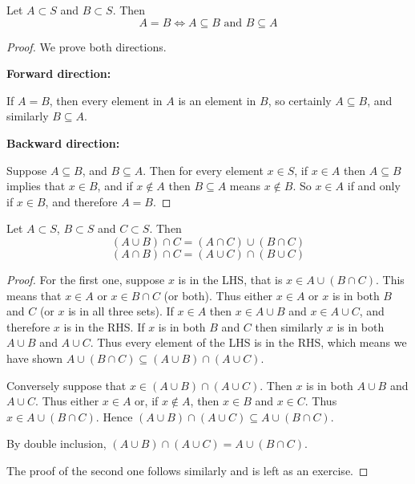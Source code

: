 \begin{proposition}
Let $A\subset S$ and $B\subset S$. Then 
\begin{equation}
A = B \iff A \subseteq B \text{ and } B \subseteq A
\end{equation}
\end{proposition}
\begin{proof} We prove both directions.

\textbf{Forward direction:}

If $A = B$, then every element in $A$ is an element in $B$, so certainly $A \subseteq B$, and
similarly $B \subseteq A$. 

\textbf{Backward direction:}

Suppose $A \subseteq B$, and $B \subseteq A$. Then for every element $x \in S$, if $x \in A$ then $A \subseteq B$ implies that $x \in B$, and if $x \notin A$ then $B \subseteq A$ means $x \notin B$. So $x \in A$ if and only if $x \in B$, and therefore $A = B$.
\end{proof}

\begin{proposition}
Let $A\subset S$, $B\subset S$ and $C\subset S$. Then
\begin{equation}
(A\cup B)\cap C = (A\cap C)\cup(B\cap C)
\end{equation}
\begin{equation}
(A\cap B)\cap C = (A\cup C)\cap(B\cup C)
\end{equation}
\end{proposition}
\begin{proof}
For the first one, suppose $x$ is in the LHS, that is $x \in A\cup(B \cap C)$. This means that $x \in A$ or $x \in B \cap C$ (or both). Thus either $x \in A$ or $x$ is in both $B$ and $C$ (or $x$ is in all three sets). If $x \in A$ then $x \in A\cup B$ and $x \in A\cup C$, and therefore $x$ is in the RHS. If $x$ is in both $B$ and $C$ then similarly $x$ is in both $A\cup B$ and $A\cup C$. Thus every element of the LHS is in the RHS, which means we have shown $A \cup (B \cap C) \subseteq (A \cup B) \cap (A \cup C)$.

Conversely suppose that $x \in (A \cup B) \cap (A \cup C)$. Then $x$ is in both $A \cup B$ and $A\cup C$. Thus either $x \in A$ or, if $x \notin A$, then $x \in B$ and $x \in C$. Thus $x \in A\cup(B \cap C)$. Hence $(A \cup B) \cap (A \cup C) \subseteq A \cup (B \cap C)$.

By double inclusion, $(A \cup B) \cap (A \cup C) = A \cup (B \cap C)$.

The proof of the second one follows similarly and is left as an exercise.
\end{proof}

